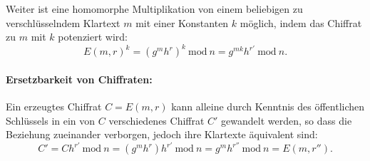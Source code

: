 Weiter ist eine homomorphe Multiplikation von einem beliebigen zu verschlüsselndem Klartext $m$ mit einer Konstanten $k$ möglich, indem das Chiffrat zu $m$ mit $k$ potenziert wird:
\begin{equation*}
E(m, r)^k = (g^{m} h^{r})^k \ \text{mod}\ n = g^{m k} h^{r'}\ \text{mod}\ n.
\end{equation*}

\paragraph{Ersetzbarkeit von Chiffraten:}

Ein erzeugtes Chiffrat $C=E(m,r)$ kann alleine durch Kenntnis des öffentlichen Schlüssels in ein von $C$ verschiedenes Chiffrat $C'$ gewandelt werden, so dass die Beziehung zueinander verborgen, jedoch ihre Klartexte äquivalent sind:
\begin{equation*}
	C' = C h^{r'}\ \text{mod}\ n = (g^{m} h^{r})h^{r'}\ \text{mod}\ n = g^{m} h^{r''}\ \text{mod}\ n = E(m,r'').
\end{equation*}
